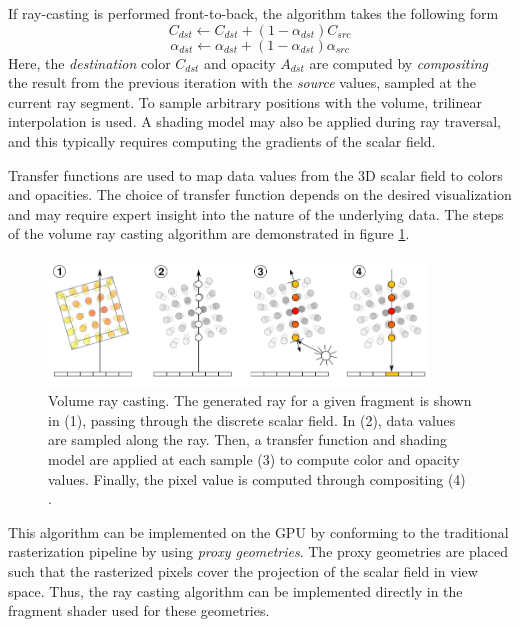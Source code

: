 \documentclass{article}
\begin{document}
If ray-casting is performed front-to-back, the algorithm takes the following form \cite{Kruger2006GPU}
$$ C_{dst} \leftarrow C_{dst} + (1-\alpha_{dst})C_{src} $$
$$ \alpha_{dst} \leftarrow \alpha_{dst} + (1-\alpha_{dst})\alpha_{src}$$
Here, the \textit{destination} color $C_{dst}$ and opacity $A_{dst}$ are computed by 
\textit{compositing} the result from the previous iteration with the \textit{source} values, sampled at the current ray segment. To sample arbitrary positions with the volume, trilinear interpolation is used. A shading model may also be applied during ray traversal,
and this typically requires computing the gradients of the scalar field.

Transfer functions are used to map data values from the 3D scalar field to colors and opacities. The choice of transfer function
depends on the desired visualization and may require expert insight into the nature of the underlying data.
The steps of the volume ray casting algorithm are demonstrated in figure \ref{fig:volumeRayCasting}.

\begin{figure}[tbh]
    \centering
    \includegraphics[width=0.9\textwidth]{images/Volume_ray_casting.png}
    \caption{Volume ray casting. The generated ray for a given fragment is shown in (1), passing through the discrete scalar field. In (2), data values are sampled along the ray. Then, a transfer function and shading model are applied at each sample (3) to compute color and opacity values. Finally, the pixel value
    is computed through compositing (4) \cite{Hofmann2011}.}
    \label{fig:volumeRayCasting}
\end{figure}


This algorithm can be implemented on the GPU by conforming to the traditional rasterization pipeline by using \textit{proxy geometries}.
The proxy geometries are placed such that the rasterized pixels cover the projection of the scalar field in view space. Thus,
the ray casting algorithm can be implemented directly in the fragment shader used for these geometries. 



\end{document}
